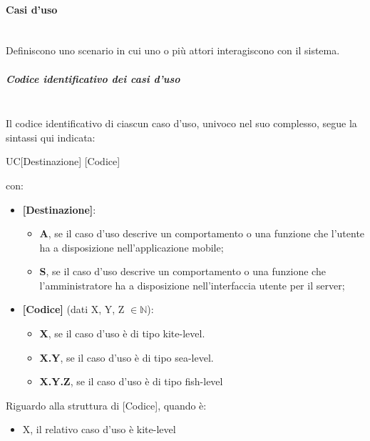 \paragraph{Casi d'uso}\mbox{}\\
Definiscono uno scenario in cui uno o più attori interagiscono con il sistema.
\setlength{\parindent}{-0.1em}
\subparagraph*{Codice identificativo dei casi d'uso}\mbox{}\\
Il codice identificativo di ciascun caso d’uso, univoco nel suo complesso, segue la sintassi qui indicata:
\begin{center}
	UC[Destinazione] [Codice]
\end{center}
con:
\begin{itemize}
	\item \textbf{[Destinazione]}:
		\begin{itemize}
			\item \textbf{A}, se il caso d’uso descrive un comportamento o una funzione che l’utente ha a disposizione nell'applicazione mobile;
			\item \textbf{S}, se il caso d’uso descrive un comportamento o una funzione che l'amministratore ha a disposizione nell'interfaccia utente per il server;
		\end{itemize}
	\item \textbf{[Codice]} (dati X, Y, Z $\in \mathbb{N}$):
	\begin{itemize}
		\item \textbf{X}, se il caso d'uso è di tipo kite-level.
		\item \textbf{X.Y}, se il caso d'uso è di tipo sea-level.
		\item \textbf{X.Y.Z}, se il caso d'uso è di tipo fish-level
	\end{itemize}
\end{itemize}

Riguardo alla struttura di [Codice], quando è:
\begin{itemize}
	\item X, il relativo caso d'uso è kite-level
\end{itemize}

